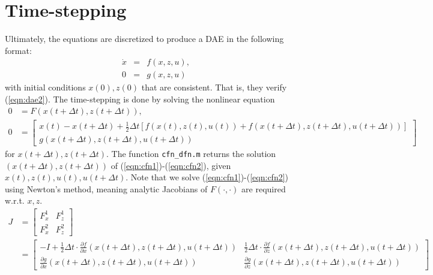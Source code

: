 \documentclass[12pt]{article}
\newcommand{\xdot}{\dot{x}}
\begin{document}
\section{Time-stepping}\label{sec:time-step}

Ultimately, the equations are discretized to produce a DAE in the following format:
\begin{eqnarray}
	\xdot &=& f(x, z, u), \label{eqn:dae1} \\
	0 &=& g(x,z,u) \label{eqn:dae2}
\end{eqnarray}
with initial conditions $x(0), z(0)$ that are consistent. That is, they verify (\ref{eqn:dae2}). The time-stepping is done by solving the nonlinear equation
\begin{align}
	 0 &= F(x(t + \Delta t), z(t + \Delta t)), \label{eqn:cfn1} \\
0 &= \left[
\begin{array}{c}
  x(t) - x(t+\Delta t) + \frac{1}{2} \Delta t \left[ f(x(t), z(t), u(t)) + f(x(t+\Delta t), z(t+\Delta t), u(t+\Delta t)) \right] \\
  g\left(x(t+\Delta t), z(t+\Delta t), u(t + \Delta t) \right)
\end{array}
\right] \label{eqn:cfn2}
\end{align} 
for $x(t+\Delta t), z(t+\Delta t)$. The function \texttt{cfn\_dfn.m} returns the solution $\left(x(t+\Delta t), z(t+\Delta t)\right)$ of (\ref{eqn:cfn1})-(\ref{eqn:cfn2}), given $x(t), z(t), u(t), u(t+\Delta t)$. Note that we solve (\ref{eqn:cfn1})-(\ref{eqn:cfn2}) using Newton's method, meaning analytic Jacobians of $F(\cdot, \cdot)$ are required w.r.t. $x,z$.
\begin{align}
J &=
\left[
\begin{array}{cc}
 F^{1}_{x} & F^{1}_{z}  \\
 F^{2}_{x} & F^{2}_{z}
\end{array}
\right] \\
&= 
\left[
\begin{array}{cc}
 -I + \frac{1}{2} \Delta t \cdot \frac{\partial f}{\partial x}(x(t+\Delta t),z(t+\Delta t),u(t+\Delta t)) & \frac{1}{2} \Delta t \cdot \frac{\partial f}{\partial z}(x(t+\Delta t),z(t+\Delta t),u(t+\Delta t))  \\
 \frac{\partial g}{\partial x}(x(t+\Delta t),z(t+\Delta t),u(t+\Delta t)) & \frac{\partial g}{\partial z}(x(t+\Delta t),z(t+\Delta t),u(t+\Delta t))
\end{array}
\right]
\end{align}
\end{document}

